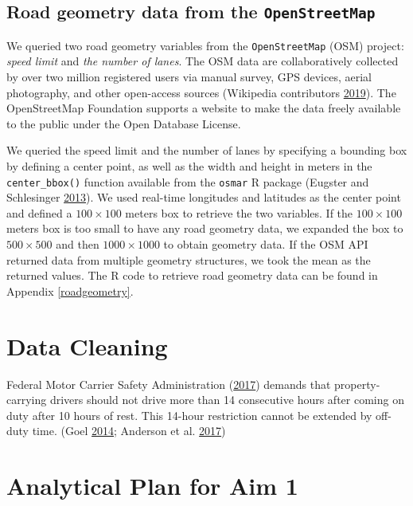 \documentclass[12pt]{book}
\numberwithin{equation}{chapter}
\begin{document}
\hypertarget{road-geometry-data-from-the-openstreetmap}{%
\subsection{\texorpdfstring{Road geometry data from the \texttt{OpenStreetMap}}{Road geometry data from the OpenStreetMap}}\label{road-geometry-data-from-the-openstreetmap}}

We queried two road geometry variables from the \texttt{OpenStreetMap} (OSM) project: \emph{speed limit} and \emph{the number of lanes}.
The OSM data are collaboratively collected by over two million registered users via manual survey, GPS devices, aerial photography, and other open-access sources (Wikipedia contributors \protect\hyperlink{ref-wikiOSM}{2019}).
The OpenStreetMap Foundation supports a website to make the data freely available to the public under the Open Database License.

We queried the speed limit and the number of lanes by specifying a bounding box by defining a center point, as well as the width and height in meters in the \texttt{center\_bbox()} function available from the \texttt{osmar} R package (Eugster and Schlesinger \protect\hyperlink{ref-eugster2013osmar}{2013}).
We used real-time longitudes and latitudes as the center point and defined a \(100\times100\) meters box to retrieve the two variables.
If the \(100\times100\) meters box is too small to have any road geometry data, we expanded the box to \(500\times500\) and then \(1000\times1000\) to obtain geometry data.
If the OSM API returned data from multiple geometry structures, we took the mean as the returned values.
The R code to retrieve road geometry data can be found in Appendix \ref{roadgeometry}.

\hypertarget{data-cleaning}{%
\section{Data Cleaning}\label{data-cleaning}}

Federal Motor Carrier Safety Administration (\protect\hyperlink{ref-hos2017}{2017}) demands that property-carrying drivers should not drive more than 14 consecutive hours after coming on duty after 10 hours of rest. This 14-hour restriction cannot be extended by off-duty time. (Goel \protect\hyperlink{ref-goel2014hours}{2014}; Anderson et al. \protect\hyperlink{ref-anderson2017exploratory}{2017})

\hypertarget{analytical-plan-for-aim-1}{%
\section{Analytical Plan for Aim 1}\label{analytical-plan-for-aim-1}}
\end{document}
